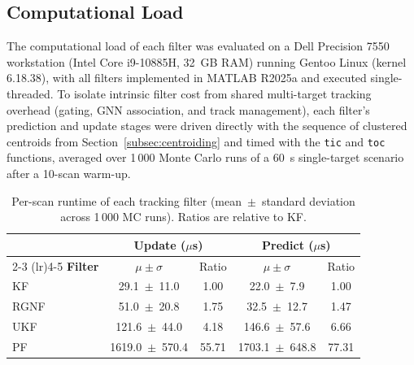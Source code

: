 \documentclass[conference]{IEEEtran}
\begin{document}
\subsection{Computational Load}
The computational load of each filter was evaluated on a Dell Precision
7550 workstation (Intel Core i9-10885H, 32~GB RAM) running Gentoo Linux
(kernel 6.18.38), with all filters implemented in MATLAB R2025a and
executed single-threaded. To isolate intrinsic filter cost from shared
multi-target tracking overhead (gating, GNN association, and track
management), each filter's prediction and update stages were driven
directly with the sequence of clustered centroids from
Section~\ref{subsec:centroiding} and timed with the \texttt{tic} and
\texttt{toc} functions, averaged over 1\,000 Monte Carlo runs of a 60~s
single-target scenario after a 10-scan warm-up.


\begin{table}[t]
    \centering
    \caption{Per-scan runtime of each tracking filter (mean~$\pm$~standard deviation across 1\,000 MC runs). Ratios are relative to KF.}
    \label{tab:comp_load}
    \begin{tabular*}{\columnwidth}{@{\extracolsep{\fill}}lcccc@{}}
        \toprule
        & \multicolumn{2}{c}{\textbf{Update} ($\mu$s)} & \multicolumn{2}{c}{\textbf{Predict} ($\mu$s)} \\
        \cmidrule(lr){2-3} \cmidrule(lr){4-5}
        \textbf{Filter} & $\mu \pm \sigma$ & Ratio & $\mu \pm \sigma$ & Ratio \\
        \midrule
        KF   &   29.1~$\pm$~11.0  & 1.00  &   22.0~$\pm$~7.9   & 1.00 \\
        RGNF &   51.0~$\pm$~20.8  & 1.75  &   32.5~$\pm$~12.7  & 1.47 \\
        UKF  &  121.6~$\pm$~44.0  & 4.18  &  146.6~$\pm$~57.6  & 6.66 \\
        PF   & 1619.0~$\pm$~570.4 & 55.71 & 1703.1~$\pm$~648.8 & 77.31 \\
        \bottomrule
    \end{tabular*}
\end{table}
  
\end{document}
